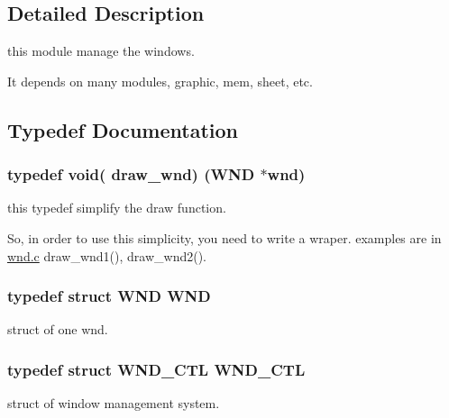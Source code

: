 \subsection{Detailed Description}
this module manage the windows. 

It depends on many modules, graphic, mem, sheet, etc. 

\subsection{Typedef Documentation}
\hypertarget{group__windows_gac65b8e04920935e2abbadbc41b8bec92}{}
\subsubsection[{draw\+\_\+wnd}]{\setlength{\rightskip}{0pt plus 5cm}typedef void( draw\+\_\+wnd) ({\bf W\+N\+D} $\ast$wnd)}\label{group__windows_gac65b8e04920935e2abbadbc41b8bec92}


this typedef simplify the draw function. 

So, in order to use this simplicity, you need to write a wraper. examples are in \hyperlink{wnd_8c}{wnd.\+c} draw\+\_\+wnd1(), draw\+\_\+wnd2(). \hypertarget{group__windows_gae0c9d0c82c2d2fe9937ca50b8f18cbbe}{}
\subsubsection[{W\+N\+D}]{\setlength{\rightskip}{0pt plus 5cm}typedef struct {\bf W\+N\+D} {\bf W\+N\+D}}\label{group__windows_gae0c9d0c82c2d2fe9937ca50b8f18cbbe}


struct of one wnd. 

\hypertarget{group__windows_gaccac09d5e99a04140ddb6e87e24988f8}{}
\subsubsection[{W\+N\+D\+\_\+\+C\+T\+L}]{\setlength{\rightskip}{0pt plus 5cm}typedef struct {\bf W\+N\+D\+\_\+\+C\+T\+L} {\bf W\+N\+D\+\_\+\+C\+T\+L}}\label{group__windows_gaccac09d5e99a04140ddb6e87e24988f8}


struct of window management system. 



